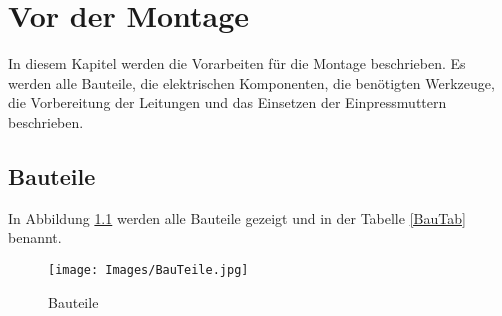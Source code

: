 %
\chapter{Vor der Montage}

In diesem Kapitel werden die Vorarbeiten für die Montage beschrieben. Es werden alle Bauteile, die elektrischen Komponenten, die benötigten Werkzeuge, die Vorbereitung der Leitungen und das Einsetzen der Einpressmuttern beschrieben.

\section{Bauteile}

In Abbildung \ref{Bauteile} werden alle Bauteile gezeigt und in der Tabelle \ref{BauTab} benannt.

\begin{figure}[H]
	\begin{center}
		\texttt{[image: Images/BauTeile.jpg]}
		\caption{Bauteile} \label{Bauteile}
	\end{center}
\end{figure}

